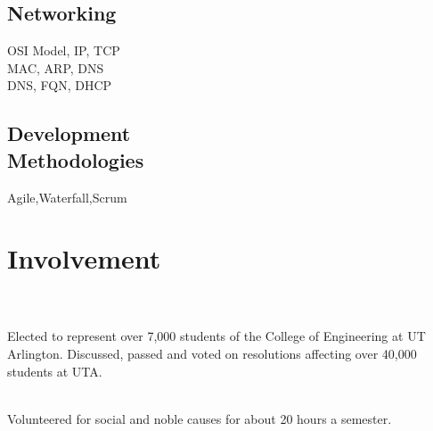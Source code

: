 \documentclass[]{deedy-resume-openfont}
\begin{document}
\begin{minipage}[t]{0.33\textwidth}
{\subsection{Networking}
\hspace*{5mm}OSI Model,\hspace{1mm} IP,
\hspace{1mm}TCP\\
\hspace*{5mm}MAC,\hspace{1mm} ARP,\hspace{1mm} DNS\\
\hspace*{5mm}DNS,\hspace{1mm} FQN,\hspace{1mm} DHCP
\sectionsep

\subsection{Development \\ Methodologies}
\hspace{5mm}Agile,\hspace{1mm}Waterfall,\hspace{1mm}Scrum

\sectionsep

}





\vspace{2mm}
\section{\huge {\bf Involvement}} 
\\
 \\
 \large  Elected to represent over 7,000 students of the College of Engineering at UT Arlington. Discussed, passed and voted on resolutions affecting over 40,000 students at UTA.
 
\sectionsep

\\
 \large Volunteered for social and noble causes for about 20 hours a semester.

\sectionsep







%
%

\end{minipage} 
\end{document}
